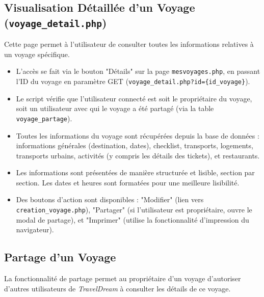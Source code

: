 \documentclass[a4paper,12pt]{article}
\begin{document}
\subsection{Visualisation Détaillée d'un Voyage (\texttt{voyage\_detail.php})}
Cette page permet à l'utilisateur de consulter toutes les informations relatives à un voyage spécifique.
\begin{itemize}
    \item L'accès se fait via le bouton "Détails" sur la page \texttt{mesvoyages.php}, en passant l'ID du voyage en paramètre GET (\texttt{voyage\_detail.php?id=\{id\_voyage\}}).
    \item Le script vérifie que l'utilisateur connecté est soit le propriétaire du voyage, soit un utilisateur avec qui le voyage a été partagé (via la table \texttt{voyage\_partage}).
    \item Toutes les informations du voyage sont récupérées depuis la base de données : informations générales (destination, dates), checklist, transports, logements, transports urbains, activités (y compris les détails des tickets), et restaurants.
    \item Les informations sont présentées de manière structurée et lisible, section par section. Les dates et heures sont formatées pour une meilleure lisibilité.
    \item Des boutons d'action sont disponibles : "Modifier" (lien vers \texttt{creation\_voyage.php}), "Partager" (si l'utilisateur est propriétaire, ouvre le modal de partage), et "Imprimer" (utilise la fonctionnalité d'impression du navigateur).
\end{itemize}

\subsection{Partage d'un Voyage}
La fonctionnalité de partage permet au propriétaire d'un voyage d'autoriser d'autres utilisateurs de \textit{TravelDream} à consulter les détails de ce voyage.
\end{document}
